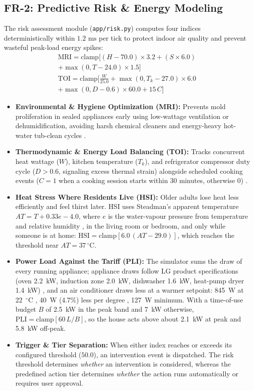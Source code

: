 \documentclass[conference]{IEEEtran}
\begin{document}
\subsection{FR-2: Predictive Risk \& Energy Modeling}
The risk assessment module (\texttt{app/risk.py}) computes four indices deterministically within $1.2\text{ ms}$ per tick to protect indoor air quality and prevent wasteful peak-load energy spikes:
\begin{multline}
\text{MRI} = \text{clamp}\big[(H - 70.0) \times 3.2 + (S \times 6.0) \\
+ \max(0, T - 24.0) \times 1.5\big]
\end{multline}
\begin{multline}
\text{TOI} = \text{clamp}\Big[\frac{W}{25.0} + \max(0, T_k - 27.0) \times 6.0 \\
+ \max(0, D - 0.6) \times 60.0 + 15\,C\Big]
\end{multline}
\begin{itemize}
    \item \textbf{Environmental \& Hygiene Optimization (MRI):} Prevents mold proliferation in sealed appliances early using low-wattage ventilation or dehumidification, avoiding harsh chemical cleaners and energy-heavy hot-water tub-clean cycles \cite{epa2022, who2009}.
    \item \textbf{Thermodynamic \& Energy Load Balancing (TOI):} Tracks concurrent heat wattage ($W$), kitchen temperature ($T_k$), and refrigerator compressor duty cycle ($D > 0.6$, signaling excess thermal strain) alongside scheduled cooking events ($C = 1$ when a cooking session starts within 30 minutes, otherwise $0$) \cite{ashrae2023}.
    \item \textbf{Heat Stress Where Residents Live (HSI):} Older adults lose heat less efficiently and feel thirst later. HSI uses Steadman's apparent temperature $AT = T + 0.33e - 4.0$, where $e$ is the water-vapour pressure from temperature and relative humidity \cite{steadman1984}, in the living room or bedroom, and only while someone is at home: $\text{HSI} = \text{clamp}[6.0\,(AT - 29.0)]$, which reaches the threshold near $AT = 37\,^\circ$C.
    \item \textbf{Power Load Against the Tariff (PLI):} The simulator sums the draw of every running appliance; appliance draws follow LG product specifications (oven 2.2~kW, induction zone 2.0~kW, dishwasher 1.6~kW, heat-pump dryer 1.4~kW) \cite{lgcook2026,lgdry2026}, and an air conditioner draws less at a warmer setpoint: 845~W at 22~$^\circ$C \cite{lgac2024}, 40~W (4.7\%) less per degree \cite{kea2017}, 127~W minimum. With a time-of-use budget $B$ of 2.5~kW in the peak band and 7~kW otherwise, $\text{PLI} = \text{clamp}[60\,L/B]$, so the house acts above about 2.1~kW at peak and 5.8~kW off-peak.
    \item \textbf{Trigger \& Tier Separation:} When either index reaches or exceeds its configured threshold ($50.0$), an intervention event is dispatched. The risk threshold determines \emph{whether} an intervention is considered, whereas the predefined action tier determines \emph{whether} the action runs automatically or requires user approval.
\end{itemize}
\end{document}
